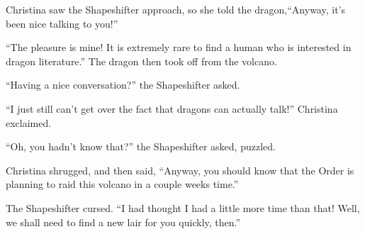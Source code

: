 \documentclass[showtrims,b6paper,draft,10pt]{memoir}
\begin{document}
Christina saw the Shapeshifter approach, so she told the dragon,``Anyway, it's been nice talking to you!''

``The pleasure is mine!  It is extremely rare to find a human who is interested in dragon literature.''  The dragon then took off from the volcano.

``Having a nice conversation?'' the Shapeshifter asked.

``I just still can't get over the fact that dragons can actually talk!''  Christina exclaimed.

``Oh, you hadn't know that?'' the Shapeshifter asked, puzzled.

Christina shrugged, and then said, ``Anyway, you should know that the Order is planning to raid this volcano in a couple weeks time.''

The Shapeshifter cursed.  ``I had thought I had a little more time than that!  Well, we shall need to find a new lair for you quickly, then.''

\appendix{}
\end{document}
